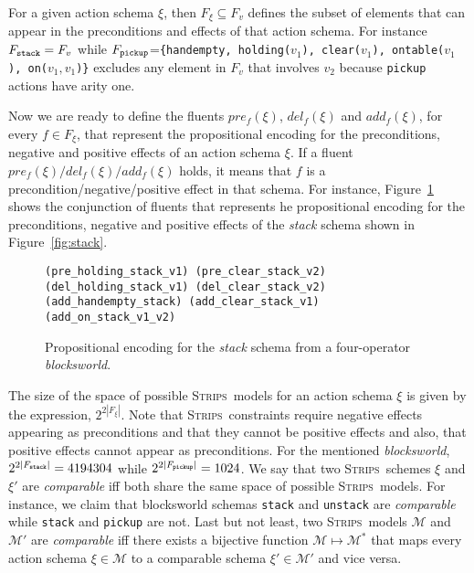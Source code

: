 \documentclass[letterpaper]{article} %
\newcommand{\strips}{\textsc{Strips}}     %
\begin{document}
For a given action schema $\xi$, then $F_{\xi}\subseteq F_v$ defines the subset of elements that can appear in the preconditions and effects of that action schema. For instance $F_{\tt stack}=F_v$ while $F_{\tt pickup}$={\small\tt\{handempty, holding($v_1$), clear($v_1$), ontable($v_1$), on($v_1,v_1$)\}} excludes any element in $F_v$ that involves $v_2$ because {\small\tt pickup} actions have arity one. 

Now we are ready to define the fluents $pre_f(\xi)$, $del_f(\xi)$ and $add_f(\xi)$, for every $f\in F_{\xi}$, that represent the propositional encoding for the preconditions, negative and positive effects of an action schema $\xi$. If a fluent $pre_f(\xi)/del_f(\xi)/add_f(\xi)$ holds, it means that $f$ is a precondition/negative/positive effect in that schema. For instance, Figure~\ref{fig:encodedstack} shows the conjunction of fluents that represents he propositional encoding for the preconditions, negative and positive effects of the {\em stack} schema shown in Figure~\ref{fig:stack}. 

\begin{figure}
\begin{scriptsize}
\begin{verbatim}
(pre_holding_stack_v1) (pre_clear_stack_v2)
(del_holding_stack_v1) (del_clear_stack_v2)
(add_handempty_stack) (add_clear_stack_v1) 
(add_on_stack_v1_v2)
\end{verbatim}
\end{scriptsize}
 \caption{\small Propositional encoding for the {\em stack} schema from a four-operator {\em blocksworld}.}
\label{fig:encodedstack}
\end{figure}

The size of the space of possible \strips\ models for an action schema $\xi$ is given by the expression, $2^{2|F_{\xi}|}$. Note that \strips\ constraints require negative effects appearing as preconditions and that they cannot be positive effects and also, that positive effects cannot appear as preconditions. For the mentioned {\em blocksworld}, $2^{2|F_{\tt stack}|}=4194304$ while $2^{2|F_{\tt pickup}|}=1024$. We say that two \strips\ schemes $\xi$ and $\xi'$ are {\em comparable} iff both share the same space of possible \strips\ models. For instance, we claim that blocksworld schemas {\small\tt stack} and {\small\tt unstack} are {\em comparable} while  {\small\tt stack} and {\small\tt pickup} are not. Last but not least, two \strips\ models $\mathcal{M}$ and $\mathcal{M}'$ are {\em comparable} iff there exists a bijective function $\mathcal{M} \mapsto \mathcal{M}^*$ that maps every action schema $\xi\in\mathcal{M}$ to a comparable schema $\xi'\in\mathcal{M'}$ and vice versa.
\end{document}
